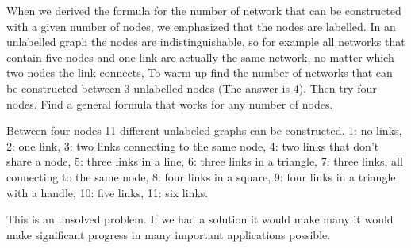 


When we derived the formula for the number of network that can be constructed with a given number of nodes, we emphasized that the nodes are labelled. In an unlabelled graph the nodes are indistinguishable, so for example all networks that contain five nodes and  one link are actually the same network, no matter which two nodes the link connects, To warm up find the number of networks that can be constructed between 3 unlabelled nodes (The answer is 4). Then try four nodes. Find a general formula that works for any number of nodes. 


\solution
Between four nodes 11 different unlabeled graphs can be constructed. 1: no links, 2: one link, 3: two links connecting to the same node, 4: two links that don't share a node, 5: three links in a line, 6: three links in a triangle, 7: three links, all connecting to the same node, 8: four links in a square, 9: four links in a triangle with a handle, 10: five links, 11: six links.

This is an unsolved problem. If we had a solution it would make many it would make significant progress in many important applications possible.

\solutionend


